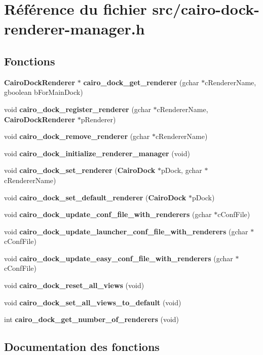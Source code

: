 \section{Référence du fichier src/cairo-dock-renderer-manager.h}
\label{cairo-dock-renderer-manager_8h}
\subsection*{Fonctions}
\begin{CompactItemize}
\item 
{\bf CairoDockRenderer} $\ast$ {\bf cairo\_\-dock\_\-get\_\-renderer} (gchar $\ast$cRendererName, gboolean bForMainDock)
\item 
void {\bf cairo\_\-dock\_\-register\_\-renderer} (gchar $\ast$cRendererName, {\bf CairoDockRenderer} $\ast$pRenderer)
\item 
void {\bf cairo\_\-dock\_\-remove\_\-renderer} (gchar $\ast$cRendererName)
\item 
void {\bf cairo\_\-dock\_\-initialize\_\-renderer\_\-manager} (void)
\item 
void {\bf cairo\_\-dock\_\-set\_\-renderer} ({\bf CairoDock} $\ast$pDock, gchar $\ast$cRendererName)
\item 
void {\bf cairo\_\-dock\_\-set\_\-default\_\-renderer} ({\bf CairoDock} $\ast$pDock)
\item 
void {\bf cairo\_\-dock\_\-update\_\-conf\_\-file\_\-with\_\-renderers} (gchar $\ast$cConfFile)
\item 
void {\bf cairo\_\-dock\_\-update\_\-launcher\_\-conf\_\-file\_\-with\_\-renderers} (gchar $\ast$cConfFile)
\item 
void {\bf cairo\_\-dock\_\-update\_\-easy\_\-conf\_\-file\_\-with\_\-renderers} (gchar $\ast$cConfFile)
\item 
void {\bf cairo\_\-dock\_\-reset\_\-all\_\-views} (void)
\item 
void {\bf cairo\_\-dock\_\-set\_\-all\_\-views\_\-to\_\-default} (void)
\item 
int {\bf cairo\_\-dock\_\-get\_\-number\_\-of\_\-renderers} (void)
\end{CompactItemize}


\subsection{Documentation des fonctions}
